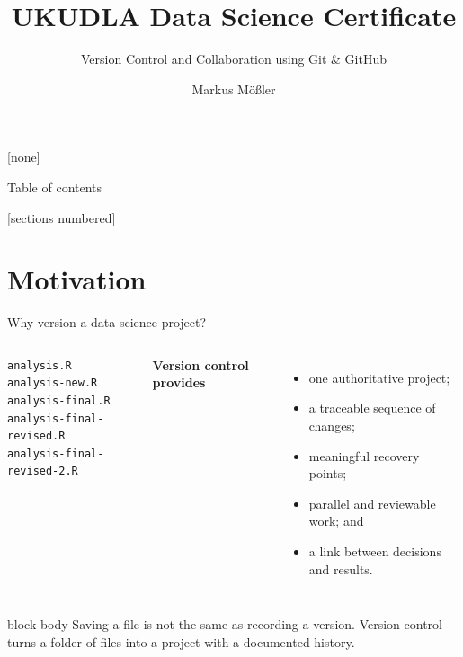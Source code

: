 \documentclass[10pt,aspectratio=169]{beamer}
\title{UKUDLA Data Science Certificate}
\subtitle{Version Control and Collaboration using Git \& GitHub}
\author{Markus Mößler}
\institute{University of Hohenheim}
\begin{document}
\maketitle

{
[none]

\begin{frame}[noframenumbering]{Table of contents}

  \small
  [sections numbered]
  \tableofcontents[hideallsubsections]

\end{frame}
}


\section{Motivation}


\begin{frame}[fragile]{Why version a data science project?}

\small

\begin{columns}[T]


\begin{verbatim}
analysis.R
analysis-new.R
analysis-final.R
analysis-final-revised.R
analysis-final-revised-2.R
\end{verbatim}


\textbf{Version control provides}

\begin{itemize}
  \item one authoritative project;
  \item a traceable sequence of changes;
  \item meaningful recovery points;
  \item parallel and reviewable work; and
  \item a link between decisions and results.
\end{itemize}

\end{columns}

\vspace{0.25cm}

\begin{beamercolorbox}[rounded=true,sep=8pt]{block body}
Saving a file is not the same as recording a version. Version control turns a
folder of files into a project with a documented history.
\end{beamercolorbox}

\end{frame}
\end{document}
